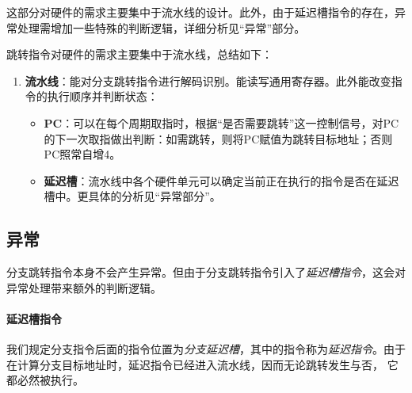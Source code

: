 这部分对硬件的需求主要集中于流水线的设计。此外，由于延迟槽指令的存在，异常处理需增加一些特殊的判断逻辑，详细分析见``异常''部分。

跳转指令对硬件的需求主要集中于流水线，总结如下：

\begin{enumerate}
    \item {\bf 流水线}：能对分支跳转指令进行解码识别。能读写通用寄存器。此外能改变指令的执行顺序并判断状态：
    \begin{itemize}
        \item {\bf PC}：可以在每个周期取指时，根据``是否需要跳转''这一控制信号，对PC的下一次取指做出判断：如需跳转，则将PC赋值为跳转目标地址；否则PC照常自增4。
        \item {\bf 延迟槽}：流水线中各个硬件单元可以确定当前正在执行的指令是否在延迟槽中。更具体的分析见``异常部分''。
    \end{itemize}
\end{enumerate}


\subsection{异常}

分支跳转指令本身不会产生异常。但由于分支跳转指令引入了\emph{延迟槽指令}，这会对异常处理带来额外的判断逻辑。


\paragraph{延迟槽指令} 我们规定分支指令后面的指令位置为\emph{分支延迟槽}，其中的指令称为\emph{延迟指令}。由于在计算分支目标地址时，延迟指令已经进入流水线，因而无论跳转发生与否，
它都必然被执行。

